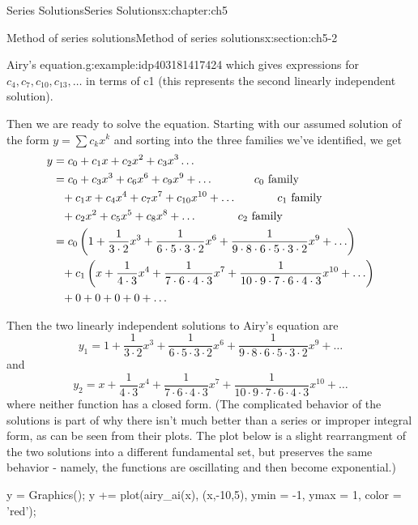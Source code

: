 \documentclass[oneside,10pt,]{book}
\numberwithin{equation}{section}
\numberwithin{equation}{section}
\newcommand{\amp}{&}
\begin{document}
\begin{chapterptx}{Series Solutions}{}{Series Solutions}{}{}{x:chapter:ch5}
\begin{sectionptx}{Method of series solutions}{}{Method of series solutions}{}{}{x:section:ch5-2}
\begin{example}{Airy's equation.}{g:example:idp403181417424}
which gives expressions for \(c_4, c_7, c_{10}, c_{13}, \ldots\) in terms of c\textunderscore{}1 (this represents the second linearly independent solution).%
\par
Then we are ready to solve the equation. Starting with our assumed solution of the form \(y = \sum c_k x^k\) and sorting into the three families we've identified, we get%
\begin{align*}
y \amp = c_0 + c_1 x + c_2 x^2 + c_3 x^3 \ldots\\
\amp = c_0 + c_3 x^3 + c_6 x^6 + c_9 x^9 + \ldots \hspace{.5in} c_0 \text{ family}\\
\amp \phantom{=} + c_1 x + c_4 x^4 + c_7 x^7 + c_{10} x^{10} + \ldots \hspace{.5in} c_1 \text{ family}\\
\amp \phantom{=} + c_2 x^2 + c_5 x^5 + c_8 x^8 + \ldots \hspace{.5in} c_2 \text{ family}\\
\amp = c_0\left( 1 + \frac{1}{3\cdot2} x^3 + \frac{1}{6\cdot5\cdot3\cdot2} x^6 + \frac{1}{9\cdot8\cdot6\cdot5\cdot3\cdot2}x^9 + \ldots \right)\\
\amp \phantom{=} + c_1\left( x + \frac{1}{4\cdot3} x^4 + \frac{1}{7\cdot6\cdot4\cdot3} x^7 + \frac{1}{10\cdot9\cdot 7\cdot6\cdot 4\cdot3} x^{10} + \ldots\right) \\
\amp \phantom{=} + 0 + 0 + 0 + 0 + \ldots 
\end{align*}
%
\par
Then the two linearly independent solutions to Airy's equation are%
\begin{equation*}
y_1 = 1 + \frac{1}{3\cdot2} x^3 + \frac{1}{6\cdot5\cdot3\cdot2} x^6 + \frac{1}{9\cdot8\cdot6\cdot5\cdot3\cdot2}x^9 + \ldots
\end{equation*}
and%
\begin{equation*}
y_2 = x + \frac{1}{4\cdot3} x^4 + \frac{1}{7\cdot6\cdot4\cdot3} x^7 + \frac{1}{10\cdot9\cdot 7\cdot6\cdot 4\cdot3} x^{10} + \ldots
\end{equation*}
where neither function has a closed form. (The complicated behavior of the solutions is part of why there isn't much better than a series or improper integral form, as can be seen from their plots. The plot below is a slight rearrangment of the two solutions into a different fundamental set, but preserves the same behavior - namely, the functions are oscillating and then become exponential.)%
\begin{sageinput}
y =  Graphics();
y += plot(airy_ai(x), (x,-10,5), ymin = -1, ymax = 1, color = 'red');

\end{sageinput}
\end{example}
\end{sectionptx}
\end{chapterptx}
\end{document}
